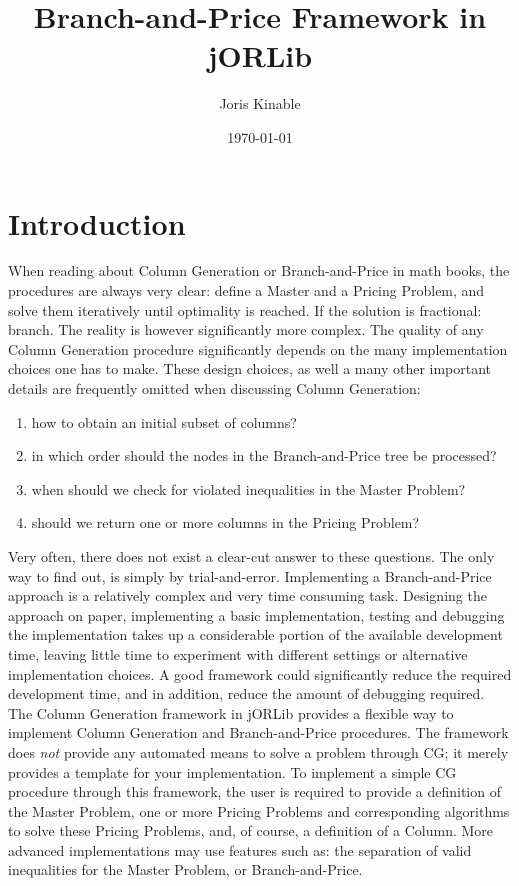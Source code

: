 \documentclass[a4paper]{article}
\begin{document}
\title{Branch-and-Price Framework in jORLib}
\author{Joris Kinable}
\date{\today}

\maketitle
\section{Introduction}
When reading about Column Generation or Branch-and-Price in math books, the procedures are always very clear: define a Master and a Pricing Problem, and solve them iteratively until optimality is reached. If the solution is fractional: branch. The reality is however significantly more complex. The quality of any Column Generation procedure significantly depends on the many implementation choices one has to make. These design choices, as well a many other important details are frequently omitted when discussing Column Generation:
\begin{enumerate}
 \item how to obtain an initial subset of columns?
 \item in which order should the nodes in the Branch-and-Price tree be processed?
 \item when should we check for violated inequalities in the Master Problem?
 \item should we return one or more columns in the Pricing Problem?
\end{enumerate}
Very often, there does not exist a clear-cut answer to these questions. The only way to find out, is simply by trial-and-error. Implementing a Branch-and-Price approach is a relatively complex and very time consuming task. Designing the approach on paper, implementing a basic implementation, testing and debugging the implementation takes up a considerable portion of the available development time, leaving little time to experiment with different settings or alternative implementation choices. A good framework could significantly reduce the required development time, and in addition, reduce the amount of debugging required.\\
The Column Generation framework in jORLib provides a flexible way to implement Column Generation and Branch-and-Price procedures. The framework does \emph{not} provide any automated means to solve a problem through CG; it merely provides a template for your implementation. To implement a simple CG procedure through this framework, the user is required to provide a definition of the Master Problem, one or more Pricing Problems and corresponding algorithms to solve these Pricing Problems, and, of course, a definition of a Column. More advanced implementations may use features such as: the separation of valid inequalities for the Master Problem, or Branch-and-Price.\\
\end{document}
